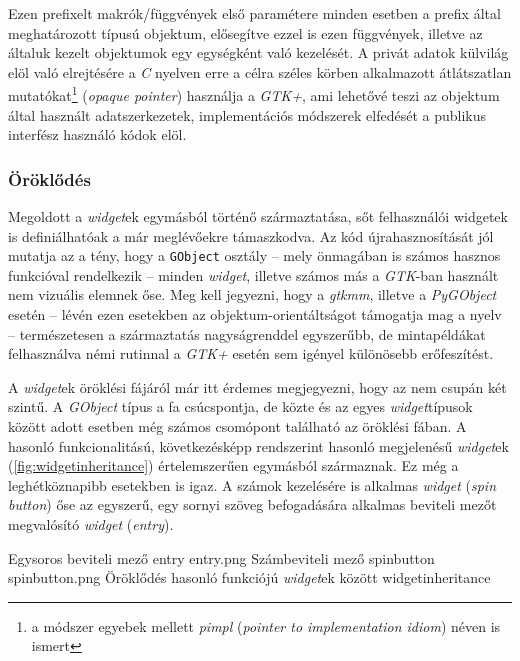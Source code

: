 Ezen prefixelt makrók/függvények első paramétere minden esetben a prefix által meghatározott típusú objektum, elősegítve ezzel is ezen függvények, illetve az általuk kezelt objektumok egy egységként való kezelését. A privát adatok külvilág elöl való elrejtésére a \textit{C} nyelven erre a célra széles körben alkalmazott átlátszatlan mutatókat\footnote{a módszer egyebek mellett \textit{pimpl} (\textit{pointer to implementation idiom}) néven is ismert} (\textit{opaque pointer}) használja a \textit{GTK+}, ami lehetővé teszi az objektum által használt adatszerkezetek, implementációs módszerek elfedését a publikus interfész használó kódok elöl.

\subsubsection{Öröklődés}

Megoldott a \textit{widget}ek egymásból történő származtatása, sőt felhasználói widgetek is definiálhatóak a már meglévőekre támaszkodva. Az kód újrahasznosítását jól mutatja az a tény, hogy a \texttt{GObject} osztály -- mely önmagában is számos hasznos funkcióval rendelkezik -- minden \textit{widget}, illetve számos  más a \textit{GTK}-ban használt nem vizuális elemnek őse. Meg kell jegyezni, hogy a \textit{gtkmm}, illetve a \textit{PyGObject} esetén -- lévén ezen esetekben az objektum-orientáltságot támogatja mag a nyelv -- természetesen a származtatás nagyságrenddel egyszerűbb, de mintapéldákat felhasználva némi rutinnal a \textit{GTK+} esetén sem igényel különösebb erőfeszítést.

A \textit{widget}ek öröklési fájáról már itt érdemes megjegyezni, hogy az nem csupán két szintű. A \textit{GObject} típus a fa csúcspontja, de közte és az egyes \textit{widget}típusok között adott esetben még számos csomópont található az öröklési fában. A hasonló funkcionalitású, következésképp rendszerint hasonló megjelenésű \textit{widget}ek (\ref{fig:widgetinheritance}) értelemszerűen egymásból származnak. Ez még a leghétköznapibb esetekben is igaz. A számok kezelésére is alkalmas \textit{widget} (\textit{spin button}) őse az egyszerű, egy sornyi szöveg befogadására alkalmas beviteli mezőt megvalósító \textit{widget} (\textit{entry}).

{Egysoros beviteli mező\cite{gtkref}}
{entry}
{entry.png}
{Számbeviteli mező\cite{gtkref}}
{spinbutton}
{spinbutton.png}
{Öröklődés hasonló funkciójú \textit{widget}ek között}
{widgetinheritance}

